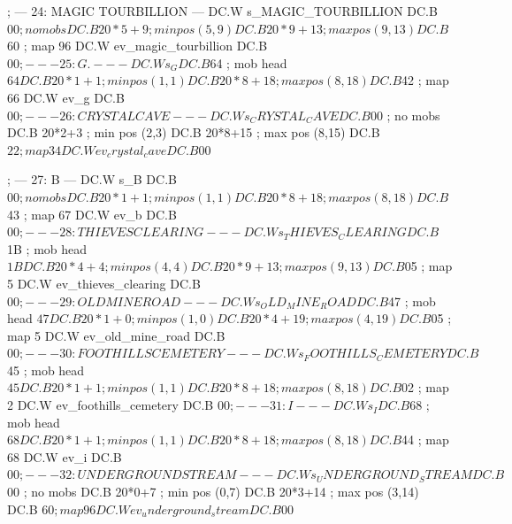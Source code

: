 \documentclass[10pt]{report}
\begin{document}
    ; --- 24: MAGIC TOURBILLION ---
    DC.W s_MAGIC_TOURBILLION
    DC.B $00                     ; no mobs
    DC.B 20*5+9                  ; min pos (5,9)
    DC.B 20*9+13                 ; max pos (9,13)
    DC.B $60                     ; map 96
    DC.W ev_magic_tourbillion
    DC.B $00

    ; --- 25: G. ---
    DC.W s_G
    DC.B $64                     ; mob head $64
    DC.B 20*1+1                  ; min pos (1,1)
    DC.B 20*8+18                 ; max pos (8,18)
    DC.B $42                     ; map 66
    DC.W ev_g
    DC.B $00

    ; --- 26: CRYSTAL CAVE ---
    DC.W s_CRYSTAL_CAVE
    DC.B $00                     ; no mobs
    DC.B 20*2+3                  ; min pos (2,3)
    DC.B 20*8+15                 ; max pos (8,15)
    DC.B $22                     ; map 34
    DC.W ev_crystal_cave
    DC.B $00

    ; --- 27: B ---
    DC.W s_B
    DC.B $00                     ; no mobs
    DC.B 20*1+1                  ; min pos (1,1)
    DC.B 20*8+18                 ; max pos (8,18)
    DC.B $43                     ; map 67
    DC.W ev_b
    DC.B $00

    ; --- 28: THIEVES CLEARING ---
    DC.W s_THIEVES_CLEARING
    DC.B $1B                     ; mob head $1B
    DC.B 20*4+4                  ; min pos (4,4)
    DC.B 20*9+13                 ; max pos (9,13)
    DC.B $05                     ; map 5
    DC.W ev_thieves_clearing
    DC.B $00

    ; --- 29: OLD MINE ROAD ---
    DC.W s_OLD_MINE_ROAD
    DC.B $47                     ; mob head $47
    DC.B 20*1+0                  ; min pos (1,0)
    DC.B 20*4+19                 ; max pos (4,19)
    DC.B $05                     ; map 5
    DC.W ev_old_mine_road
    DC.B $00

    ; --- 30: FOOTHILLS CEMETERY ---
    DC.W s_FOOTHILLS_CEMETERY
    DC.B $45                     ; mob head $45
    DC.B 20*1+1                  ; min pos (1,1)
    DC.B 20*8+18                 ; max pos (8,18)
    DC.B $02                     ; map 2
    DC.W ev_foothills_cemetery
    DC.B $00

    ; --- 31: I ---
    DC.W s_I
    DC.B $68                     ; mob head $68
    DC.B 20*1+1                  ; min pos (1,1)
    DC.B 20*8+18                 ; max pos (8,18)
    DC.B $44                     ; map 68
    DC.W ev_i
    DC.B $00

    ; --- 32: UNDERGROUND STREAM ---
    DC.W s_UNDERGROUND_STREAM
    DC.B $00                     ; no mobs
    DC.B 20*0+7                  ; min pos (0,7)
    DC.B 20*3+14                 ; max pos (3,14)
    DC.B $60                     ; map 96
    DC.W ev_underground_stream
    DC.B $00
\end{document}
